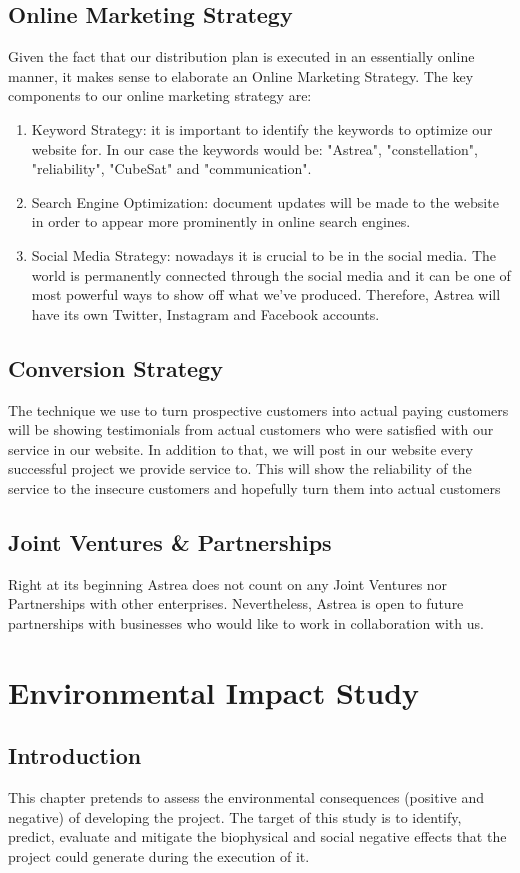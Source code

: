 \section{Online Marketing Strategy}
Given the fact that our distribution plan is executed in an essentially online manner, it makes sense to elaborate an Online Marketing Strategy. The key components to our online marketing strategy are:
\begin{enumerate}
\item Keyword Strategy: it is important to identify the keywords to optimize our website for. In our case the keywords would be: "Astrea", "constellation", "reliability", "CubeSat" and "communication".
\item Search Engine Optimization: document updates will be made to the website in order to appear more prominently in online search engines.
\item Social Media Strategy: nowadays it is crucial to be in the social media. The world is permanently connected through the social media and it can be one of most powerful ways to show off what we've produced. Therefore, Astrea will have its own Twitter, Instagram and Facebook accounts.
\end{enumerate}
\section{Conversion Strategy}
The technique we use to turn prospective customers into actual paying customers will be showing testimonials from actual customers who were satisfied with our service in our website. In addition to that, we will post in our website every successful project we provide service to. This will show the reliability of the service to the insecure customers and hopefully turn them into actual customers
\section{Joint Ventures \& Partnerships}
Right at its beginning Astrea does not count on any Joint Ventures nor Partnerships with other enterprises. Nevertheless, Astrea is open to future partnerships with businesses who would like to work in collaboration with us.




\chapter{Environmental Impact Study}
\section{Introduction}
This chapter pretends to assess the environmental consequences (positive and negative) of developing the project. The target of this study is to identify, predict, evaluate and mitigate the biophysical and social negative effects that the project could generate during the execution of it.

